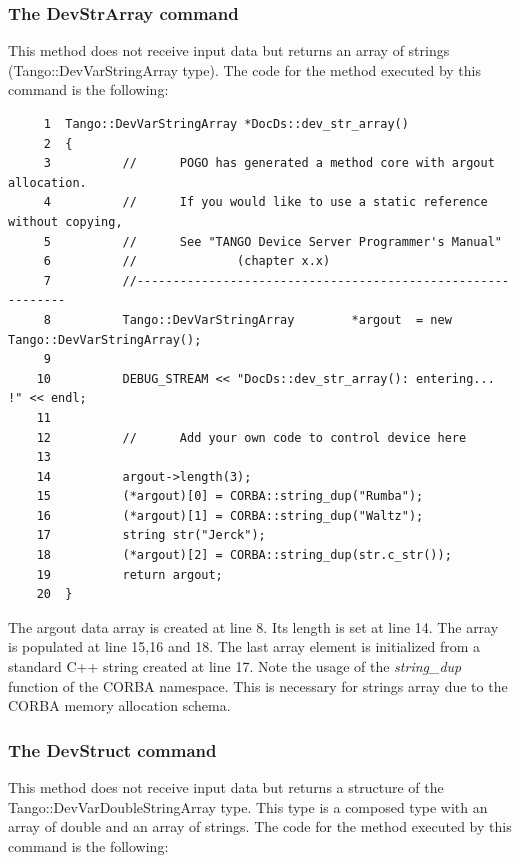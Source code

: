 \subsubsection{The DevStrArray command}

This method does not receive input data but returns an array of strings
(Tango::DevVarStringArray type).
The code for the method executed by this command is the following:


\begin{verbatim}
     1  Tango::DevVarStringArray *DocDs::dev_str_array()
     2  {
     3          //      POGO has generated a method core with argout allocation.
     4          //      If you would like to use a static reference without copying,
     5          //      See "TANGO Device Server Programmer's Manual"
     6          //              (chapter x.x)
     7          //------------------------------------------------------------
     8          Tango::DevVarStringArray        *argout  = new Tango::DevVarStringArray();
     9  
    10          DEBUG_STREAM << "DocDs::dev_str_array(): entering... !" << endl;
    11  
    12          //      Add your own code to control device here
    13  
    14          argout->length(3);
    15          (*argout)[0] = CORBA::string_dup("Rumba");
    16          (*argout)[1] = CORBA::string_dup("Waltz");
    17          string str("Jerck");
    18          (*argout)[2] = CORBA::string_dup(str.c_str());
    19          return argout;
    20  }
\end{verbatim}


The argout data array is created at line 8. Its length is set at line
14. The array is populated at line 15,16 and 18. The last array element
is initialized from a standard C++ string created at line 17. Note
the usage of the \emph{string\_dup} function of
the CORBA namespace. This is necessary for strings array due to the
CORBA memory allocation schema.


\subsubsection{The DevStruct command}

This method does not receive input data but returns a structure of
the Tango::DevVarDoubleStringArray
type. This type is a composed type with an array of double and an
array of strings. The code for the method executed by this command
is the following:


